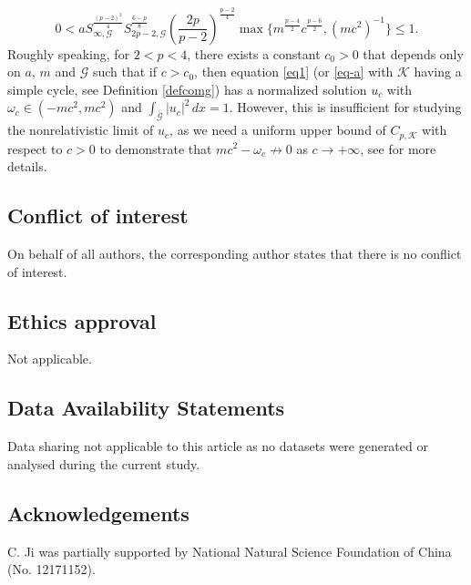 \documentclass[11pt]{amsart}
\newcommand{\abs}[1]{\lvert#1\rvert}
\newcommand{\G}{\mathcal{G}}
\newcommand{\K}{\mathcal{K}}
\numberwithin{equation}{section}
\begin{document}
    \begin{equation*}\label{eqapppin26g}
         0<a S_{\infty,\G}^\frac{(p-2)^2}{4}S_{2p-2,\G}^\frac{6-p}{8}\left(\frac{2p}{p-2}\right)^\frac{p-2}{4} \max\{m^\frac{p-4}{2}c^\frac{p-6}{2},(mc^2)^{-1}\}\leq 1.
    \end{equation*}
    Roughly speaking, for $2<p<4$, there exists a constant $c_0>0$ that depends only on $a$, $m$ and $\G$ such that if $c>c_0$, then equation \eqref{eq1} (or \eqref{eq-a} with $\K$ having a simple cycle, see Definition \ref{defcomg}) has a normalized solution $u_c$ with $\omega_c \in (-mc^2,mc^2)$ and $\int_{\G}\abs{u_c}^{2}\, dx=1$. However, this is insufficient for studying the nonrelativistic limit of $u_c$, as we need a uniform upper bound of $C_{p,\K}$ with respect to $c>0$ to  demonstrate that $mc^2-\omega_c\not \to0$ as $c \to +\infty$, see \cite[Theorem 2.13]{Bo} for more details.

\subsection*{Conflict of interest}

On behalf of all authors, the corresponding author states that there is no conflict of interest.

\subsection*{Ethics approval}
 Not applicable.

\subsection*{Data Availability Statements}
Data sharing not applicable to this article as no datasets were generated or analysed during the current study.

\subsection*{Acknowledgements}
 C. Ji was partially supported by National Natural Science Foundation of China (No. 12171152).
\end{document}
